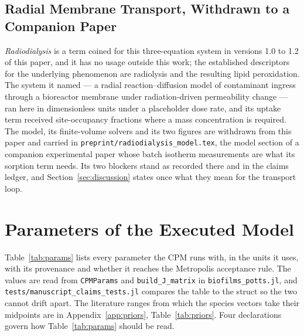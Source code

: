 \documentclass[11pt]{article}
\begin{document}
\subsection{Radial Membrane Transport, Withdrawn to a Companion Paper}
\label{sec:radiodialysis}

\emph{Radiodialysis} is a term coined for this three-equation system in versions 1.0 to 1.2 of this paper, and it has no usage outside this work;
the established descriptors for the underlying phenomenon are radiolysis and the resulting lipid
peroxidation. The system it named --- a radial reaction--diffusion model of contaminant ingress
through a bioreactor membrane under radiation-driven permeability change --- ran here in
dimensionless units under a placeholder dose rate, and its uptake term received site-occupancy
fractions where a mass concentration is required. The model, its finite-volume solvers and its two
figures are withdrawn from this paper and carried in \texttt{preprint/radiodialysis\_model.tex},
the model section of a companion experimental paper whose batch isotherm measurements are what
its sorption term needs. Its two blockers stand as recorded there and in the claims ledger, and
Section~\ref{sec:discussion} states once what they mean for the transport loop.

\section{Parameters of the Executed Model}\label{sec:params}

Table~\ref{tab:params} lists every parameter the CPM runs with, in the units it uses, with its
provenance and whether it reaches the Metropolis acceptance rule. The values are read from
\texttt{CPMParams} and \texttt{build\_J\_matrix} in \texttt{biofilms\_potts.jl}, and
\texttt{tests/manuscript\_claims\_tests.jl} compares the table to the struct so the two cannot
drift apart. The literature ranges from which the species vectors take their midpoints are in
Appendix~\ref{app:priors}, Table~\ref{tab:priors}. Four declarations govern how
Table~\ref{tab:params} should be read.
\end{document}
